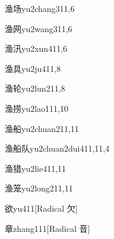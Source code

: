 \begin{verbete}{渔场}{yu2chang3}{11,6}
\end{verbete}

\begin{verbete}{渔网}{yu2wang3}{11,6}
\end{verbete}

\begin{verbete}{渔汛}{yu2xun4}{11,6}
\end{verbete}

\begin{verbete}{渔具}{yu2ju4}{11,8}
\end{verbete}

\begin{verbete}{渔轮}{yu2lun2}{11,8}
\end{verbete}

\begin{verbete}{渔捞}{yu2lao1}{11,10}
\end{verbete}

\begin{verbete}{渔船}{yu2chuan2}{11,11}
\end{verbete}

\begin{verbete}{渔船队}{yu2chuan2dui4}{11,11,4}
\end{verbete}

\begin{verbete}{渔猎}{yu2lie4}{11,11}
\end{verbete}

\begin{verbete}{渔笼}{yu2long2}{11,11}
\end{verbete}

\begin{verbete}{欲}{yu4}{11}[Radical 欠]
\end{verbete}

\begin{verbete}{章}{zhang1}{11}[Radical 音]
\end{verbete}

